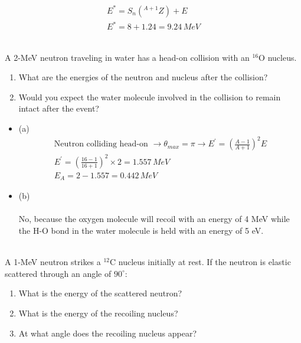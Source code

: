 \documentclass{homework}
\begin{document}
\begin{sol}
  \begin{gather*}
    E^{*} = S_{n}\!\left(^{A+1}Z\right) + E\\
    E^{*} = 8 + 1.24 = 9.24\,MeV
  \end{gather*}
\end{sol}

\question \\
A 2-MeV neutron traveling in water has a head-on collision with an $^{16}\mathrm{O}$ nucleus.
\begin{enumerate}[label={(\alph*)}]
\item What are the energies of the neutron and nucleus after the collision?
\item Would you expect the water molecule involved in the collision to remain intact after the event?
\end{enumerate}

\begin{sol}
  \begin{itemize}
      \item{(a)}
        \begin{gather*}
        \text{Neutron colliding head-on } \rightarrow \theta_{max} = \pi \rightarrow E^{'} = (\frac{A-1}{A+1})^{2}E \\
        E^{'} = (\frac{16-1}{16+1})^{2}\times 2 = 1.557\,MeV\\
        E_{A} = 2 - 1.557 = 0.442\,MeV
    \end{gather*}
       \item{(b)}
      \\
      \\ 
      No, because the oxygen molecule will recoil with an energy of  4 MeV while the H-O bond in the water molecule is held with an energy of 5 eV.
  \end{itemize}
\end{sol}

\question\\
A 1-MeV neutron strikes a $^{12}\mathrm{C}$ nucleus initially at rest. 
If the neutron is elastic scattered through an angle of $90^{\circ}$:
\begin{enumerate}[label=\textbf{(\alph*)}]
\item What is the energy of the scattered neutron?
\item What is the energy of the recoiling nucleus?
\item At what angle does the recoiling nucleus appear?
\end{enumerate}
\end{document}
